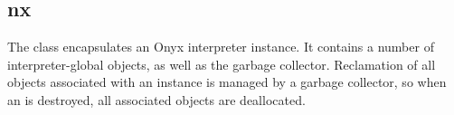 %
%
%
%
%              

\subsection{nx}
\label{nx}

The  class encapsulates an Onyx interpreter instance.  It contains
a number of interpreter-global objects, as well as the garbage collector.
Reclamation of all objects associated with an  instance is managed
by a garbage collector, so when an  is destroyed, all associated
objects are deallocated.

